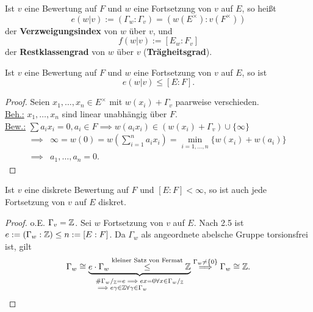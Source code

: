 \begin{definition}
    Ist $v$ eine Bewertung auf $F$ und $w$ eine Fortsetzung von $v$ auf $E$, so heißt
    $$ e(w|v) := (\Gamma_w: \Gamma_v) = (w(E^\times):v(F^\times))$$
    der \textbf{Verzweigungsindex} von $w$ über $v$, und 
    $$ f(w|v) := [E_w : F_v]$$
    der \textbf{Restklassengrad} von $w$ über $v$ (\textbf{Trägheitsgrad}). 
    
    
    \begin{figure}[H]
        \centering
    \end{figure}
\end{definition}

\begin{lemma}
    Ist $v$ eine Bewertung auf $F$ und $w$ eine Fortsetzung von $v$ auf $E$, so ist
    $$ e(w|v) \leq [E:F].$$
\end{lemma}
\begin{proof}
    Seien $x_1,\ldots,x_n \in E^\times$ mit $w(x_i) + \Gamma_v$ paarweise verschieden.\\
    \underline{Beh.:} $x_1,\ldots,x_n$ sind linear unabhängig über $F$.\\
    \underline{Bew.:} $\sum\limits a_i x_i = 0, a_i \in F \implies w(a_ix_i) \in (w(x_i)+\Gamma_v)\cup \{\infty\}$
    \begin{align*}
        \implies & \infty = w(0) = w\left(\sum\limits_{i=1}^na_ix_i\right) = \min\limits_{i=1,\ldots,n}\{w(x_i)+w(a_i)\}\\
        \implies & a_1,\ldots,a_n = 0.
    \end{align*}
\end{proof}

\begin{satz}
    Ist $v$ eine diskrete Bewertung auf $F$ und $[E:F] < \infty$, so ist auch jede Fortsetzung von $v$ auf $E$ diskret.
\end{satz}
\begin{proof}
    o.E. $\Gamma_v = \mathbb{Z}$. Sei $w$ Fortsetzung von $v$ auf $E$.
    Nach 2.5 ist $e:=(\Gamma_w:\mathbb{Z}) \leq n := [E:F]$.
    Da $\Gamma_w$ als angeordnete abelsche Gruppe torsionsfrei ist, gilt
    $$ \Gamma_w \cong \underbrace{e \cdot \Gamma_w \stackrel{\text{kleiner Satz von Fermat}}{\leq} \mathbb{Z}}_{\begin{subarray}{l}
        \#\Gamma_w/_{\mathbb{Z}} = e \implies ex = 0 \forall x \in \Gamma_w/_{\mathbb{Z}}\\
        \implies e\gamma \in \mathbb{Z} \forall \gamma \in \Gamma_w
    \end{subarray}}
    \stackrel{\Gamma_w \ne \{0\}}{\implies} \Gamma_w \cong \mathbb{Z}.$$
\end{proof}

